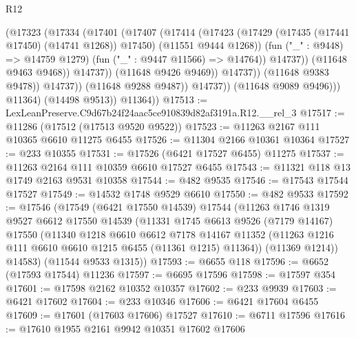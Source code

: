 \begin{lexlean}{R12}
\begin{coremodule}
                                    (@17323
                                      (@17334
                                        (@17401
                                          (@17407
                                            (@17414
                                              (@17423
                                                (@17429
                                                  (@17435 (@17441 @17450) (@14741 @1268))
                                                  @17450)
                                                (@11551 @9444 @1268))
                                              (fun ("_" : @9448) => @14759 @1279)
                                              (fun ("_" : @9447 @11566) => @14764))
                                            @14737))
                                        (@11648 @9463 @9468))
                                      @14737))
                                  (@11648 @9426 @9469))
                                @14737))
                            (@11648 @9383 @9478))
                          @14737))
                      (@11648 @9288 @9487))
                    @14737))
                (@11648 @9089 @9496)))
            @11364)
          (@14498 @9513))
        @11364))
@17513 := LexLeanPreserve.C9d67b24f24aac5ce910839d82af3191a.R12.__rel_3
@17517 := @11286 (@17512 (@17513 @9520 @9522))
@17523 := @11263 @2167 @111 @10365 @6610 @11275 @6455
@17526 := @11304 @2166 @10361 @10364
@17527 := @233 @10355
@17531 := @17526 (@6421 @17527 @6455) @11275
@17537 := @11263 @2164 @111 @10359 @6610 @17527 @6455
@17543 := @11321 @118 @13 @1749 @2163 @9531 @10358
@17544 := @482 @9535
@17546 := @17543 @17544 @17527
@17549 := @14532 @1748 @9529 @6610
@17550 := @482 @9533
@17592 := @17546
    (@17549
      (@6421 @17550 @14539)
      @17544
      (@11263
        @1746
        @1319
        @9527
        @6612
        @17550
        @14539
        (@11331
          @1745
          @6613
          @9526
          (@7179 @14167)
          @17550
          (@11340
            @1218
            @6610
            @6612
            @7178
            @14167
            @11352
            (@11263 @1216 @111 @6610 @6610 @1215 @6455 (@11361 @1215) @11364))
          (@11369 @1214))
        @14583)
      (@11544 @9533 @1315))
@17593 := @6655 @118
@17596 := @6652 (@17593 @17544) @11236
@17597 := @6695 @17596
@17598 := @17597 @354
@17601 := @17598 @2162 @10352 @10357
@17602 := @233 @9939
@17603 := @6421 @17602
@17604 := @233 @10346
@17606 := @6421 @17604 @6455
@17609 := @17601 (@17603 @17606) @17527
@17610 := @6711 @17596
@17616 := @17610 @1955 @2161 @9942 @10351 @17602 @17606

\end{coremodule}
\end{lexlean}
